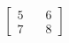 \documentclass[preview]{standalone}
\begin{document}
\begin{align*}
\begin{bmatrix} 5 & \quad 6 \\ 7 & \quad 8 \end{bmatrix}
\end{align*}
\end{document}
